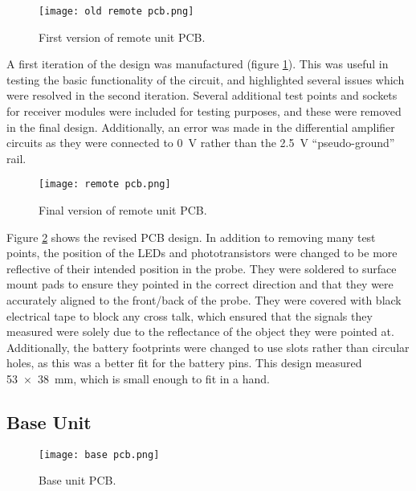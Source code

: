 \begin{figure}[htbp]
	\centering
	\texttt{[image: old remote pcb.png]}
	\caption{First version of remote unit PCB.}
	\label{fig: old remote pcb}
\end{figure}

A first iteration of the design was manufactured (figure \ref{fig: old remote pcb}). This was useful in testing the basic functionality of the circuit, and highlighted several issues which were resolved in the second iteration. Several additional test points and sockets for receiver modules were included for testing purposes, and these were removed in the final design. Additionally, an error was made in the differential amplifier circuits as they were connected to \SI{0}{\volt} rather than the \SI{2.5}{\volt} ``pseudo-ground'' rail. \\



\begin{figure}[htbp]
	\centering
	\texttt{[image: remote pcb.png]}
	\caption{Final version of remote unit PCB.}
	\label{fig: remote pcb}
\end{figure}

Figure \ref{fig: remote pcb} shows the revised PCB design. In addition to removing many test points, the position of the LEDs and phototransistors were changed to be more reflective of their intended position in the probe. They were soldered to surface mount pads to ensure they pointed in the correct direction and that they were accurately aligned to the front/back of the probe. They were covered with black electrical tape to block any cross talk, which ensured that the signals they measured were solely due to the reflectance of the object they were pointed at. Additionally, the battery footprints were changed to use slots rather than circular holes, as this was a better fit for the battery pins. This design measured \SI{53x38}{\milli\metre}, which is small enough to fit in a hand.\\






\subsection{Base Unit}

\begin{figure}[htbp]
	\centering
	\texttt{[image: base pcb.png]}
	\caption{Base unit PCB.}
	\label{fig: base pcb}
\end{figure}


